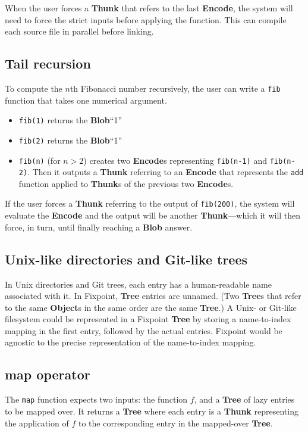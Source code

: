 \documentclass{article}
\newcommand{\blob}{\textbf{Blob}\xspace}
\newcommand{\objects}{\textbf{Object}s\xspace}
\newcommand{\encode}{\textbf{Encode}\xspace}
\newcommand{\thunk}{\textbf{Thunk}\xspace}
\newcommand{\thunks}{\textbf{Thunk}s\xspace}
\newcommand{\encodes}{\textbf{Encode}s\xspace}
\newcommand{\tree}{\textbf{Tree}\xspace}
\newcommand{\trees}{\textbf{Tree}s\xspace}
\begin{document}
When the user forces a \thunk that refers to the last \encode, the
system will need to force the strict inputs before applying the
function. This can compile each source file in parallel before
linking.

\subsection{Tail recursion} To compute the $n$th Fibonacci number
recursively, the user can write a \texttt{fib} function that
takes one numerical argument.
\begin{itemize}[itemsep=0pt]
\item \texttt{fib(1)} returns the \blob ``1''
\item \texttt{fib(2)} returns the \blob ``1''
  \item \texttt{fib(n)} (for $n>2$) creates two \encodes
    representing \texttt{fib(n-1)} and \texttt{fib(n-2)}.
    Then it outputs a \thunk referring to an \encode that represents
    the \texttt{add} function applied to \thunks of the previous two \encodes.
    \end{itemize}

If the user forces a \thunk referring to the output of \texttt{fib(200)}, the system will
evaluate the \encode and the output will be another \thunk---which it will then force, in turn,
until finally reaching a \blob answer.

\subsection{Unix-like directories and Git-like trees}

In Unix directories and Git trees, each entry has a human-readable
name associated with it. In Fixpoint, \tree entries are unnamed. (Two
\trees that refer to the same \objects in the same order are the same
\tree.) A Unix- or Git-like filesystem could be represented in a
Fixpoint \tree by storing a name-to-index mapping in the first entry,
followed by the actual entries. Fixpoint would be agnostic to the
precise representation of the name-to-index mapping.

\subsection{map operator} The \texttt{map} function expects
two inputs: the function $f$, and a \tree of lazy entries to be mapped
over. It returns a \tree where each entry is a \thunk representing the
application of $f$ to the corresponding entry in the mapped-over
\tree.
\end{document}
